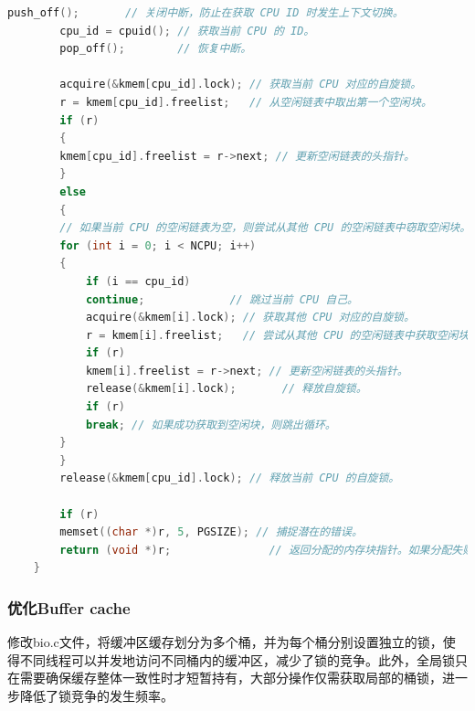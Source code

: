 \begin{enumerate}
\begin{lstlisting}[language=c,title=对kalloc函数的修改]
        push_off();       // 关闭中断，防止在获取 CPU ID 时发生上下文切换。
        cpu_id = cpuid(); // 获取当前 CPU 的 ID。
        pop_off();        // 恢复中断。
    
        acquire(&kmem[cpu_id].lock); // 获取当前 CPU 对应的自旋锁。
        r = kmem[cpu_id].freelist;   // 从空闲链表中取出第一个空闲块。
        if (r)
        {
        kmem[cpu_id].freelist = r->next; // 更新空闲链表的头指针。
        }
        else
        {
        // 如果当前 CPU 的空闲链表为空，则尝试从其他 CPU 的空闲链表中窃取空闲块。
        for (int i = 0; i < NCPU; i++)
        {
            if (i == cpu_id)
            continue;             // 跳过当前 CPU 自己。
            acquire(&kmem[i].lock); // 获取其他 CPU 对应的自旋锁。
            r = kmem[i].freelist;   // 尝试从其他 CPU 的空闲链表中获取空闲块。
            if (r)
            kmem[i].freelist = r->next; // 更新空闲链表的头指针。
            release(&kmem[i].lock);       // 释放自旋锁。
            if (r)
            break; // 如果成功获取到空闲块，则跳出循环。
        }
        }
        release(&kmem[cpu_id].lock); // 释放当前 CPU 的自旋锁。
    
        if (r)
        memset((char *)r, 5, PGSIZE); // 捕捉潜在的错误。
        return (void *)r;               // 返回分配的内存块指针。如果分配失败，则返回 0。
    }            
    \end{lstlisting}
\end{enumerate}

\subsubsection{优化Buffer cache}

修改bio.c文件，将缓冲区缓存划分为多个桶，并为每个桶分别设置独立的锁，使得不同线程可以并发地访问不同桶内的缓冲区，减少了锁的竞争。此外，全局锁只在需要确保缓存整体一致性时才短暂持有，大部分操作仅需获取局部的桶锁，进一步降低了锁竞争的发生频率。

